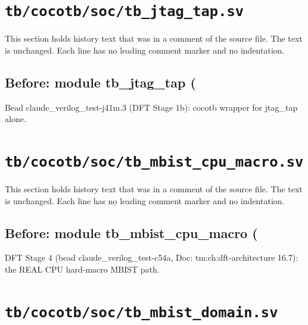 \section{\texttt{tb/cocotb/soc/tb\_jtag\_tap.sv}}\label{cr:suite:soc-tb-jtag-tap-sv}

This section holds history text that was in a comment of the source file. The text is unchanged. Each line has no leading comment marker and no indentation.

\begin{record}

\subsection*{Before: module tb\_jtag\_tap (}

\begin{textblock}
Bead claude_verilog_test-j41m.3 (DFT Stage 1b): cocotb wrapper for jtag_tap alone.
\end{textblock}

\end{record}

\section{\texttt{tb/cocotb/soc/tb\_mbist\_cpu\_macro.sv}}\label{cr:suite:soc-tb-mbist-cpu-macro-sv}

This section holds history text that was in a comment of the source file. The text is unchanged. Each line has no leading comment marker and no indentation.

\begin{record}

\subsection*{Before: module tb\_mbist\_cpu\_macro (}

\begin{textblock}
DFT Stage 4 (bead claude_verilog_test-c54a, Doc: tm:ch:dft-architecture 16.7): the REAL CPU hard-macro MBIST path.
\end{textblock}

\end{record}

\section{\texttt{tb/cocotb/soc/tb\_mbist\_domain.sv}}\label{cr:suite:soc-tb-mbist-domain-sv}

